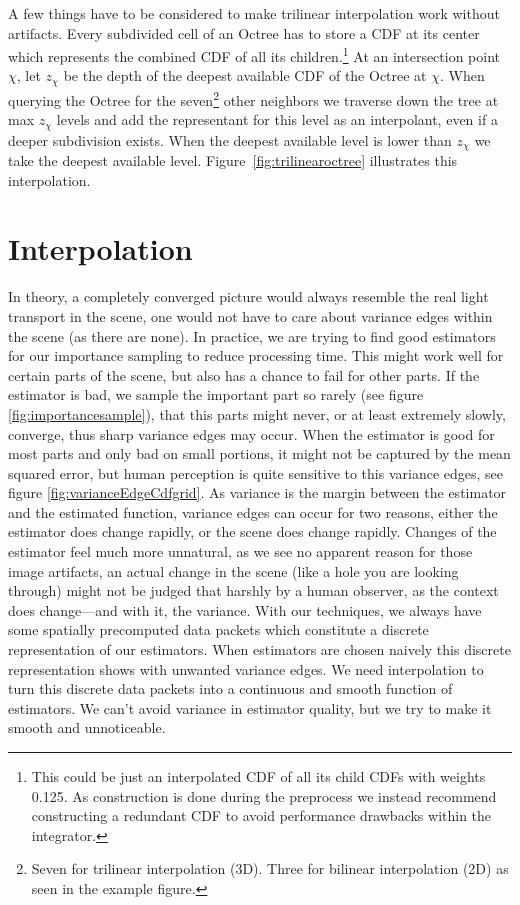 A few things have to be considered to make trilinear interpolation work without artifacts. Every subdivided cell of an Octree has to store a CDF at its center which represents the combined CDF of all its children.\footnote{This could be just an interpolated CDF of all its child CDFs with weights 0.125. As construction is done during the preprocess we instead recommend constructing a redundant CDF to avoid performance drawbacks within the integrator.} At an intersection point $\chi$, let $z_\chi$ be the depth of the deepest available CDF of the Octree at $\chi$. When querying the Octree for the seven\footnote{Seven for trilinear interpolation (3D). Three for bilinear interpolation (2D) as seen in the example figure.} other neighbors we traverse down the tree at max $z_\chi$ levels and add the representant for this level as an interpolant, even if a deeper subdivision exists. When the deepest available level is lower than $z_\chi$ we take the deepest available level. Figure~\ref{fig:trilinearoctree} illustrates this interpolation.


\section{Interpolation}
\label{ch:interpolation}

In theory, a completely converged picture would always resemble the real light transport in the scene, one would not have to care about variance edges within the scene (as there are none). In practice, we are trying to find good estimators for our importance sampling to reduce processing time. This might work well for certain parts of the scene, but also has a chance to fail for other parts. If the estimator is bad, we sample the important part so rarely (see figure \ref{fig:importancesample}), that this parts might never, or at least extremely slowly, converge, thus sharp variance edges may occur. When the estimator is good for most parts and only bad on small portions, it might not be captured by the mean squared error, but human perception is quite sensitive to this variance edges, see figure \ref{fig:varianceEdgeCdfgrid}. As variance is the margin between the estimator and the estimated function, variance edges can occur for two reasons, either the estimator does change rapidly, or the scene does change rapidly. Changes of the estimator feel much more unnatural, as we see no apparent reason for those image artifacts, an actual change in the scene (like a hole you are looking through) might not be judged that harshly by a human observer, as the context does change---and with it, the variance. With our techniques, we always have some spatially precomputed data packets which constitute a discrete representation of our estimators. When estimators are chosen naively this discrete representation shows with unwanted variance edges. We need interpolation to turn this discrete data packets into a continuous and smooth function of estimators. We can't avoid variance in estimator quality, but we try to make it smooth and unnoticeable.

